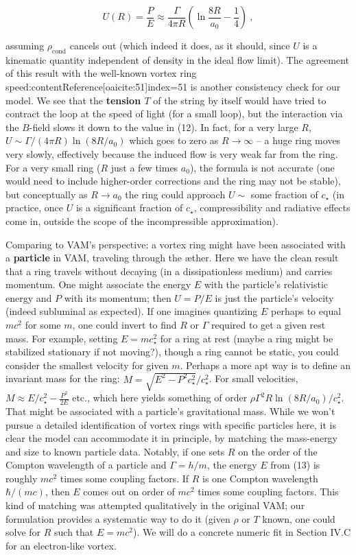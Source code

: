 \documentclass[12pt]{article}
\begin{document}
\[ U(R) = \frac{P}{E} \approx \frac{\Gamma}{4\pi R} \left(\ln\frac{8R}{a_0} - \frac{1}{4}\right)~, \] 

assuming $\rho_{\text{cond}}$ cancels out (which indeed it does, as it should, since $U$ is a kinematic quantity independent of density in the ideal flow limit). The agreement of this result with the well-known vortex ring speed:contentReference[oaicite:51]{index=51} is another consistency check for our model. We see that the \textbf{tension $T$} of the string by itself would have tried to contract the loop at the speed of light (for a small loop), but the interaction via the $B$-field slows it down to the value in (12). In fact, for a very large $R$, $U \sim \Gamma/(4\pi R)\ln(8R/a_0)$ which goes to zero as $R\to \infty$ – a huge ring moves very slowly, effectively because the induced flow is very weak far from the ring. For a very small ring ($R$ just a few times $a_0$), the formula is not accurate (one would need to include higher-order corrections and the ring may not be stable), but conceptually as $R \to a_0$ the ring could approach $U \sim$ some fraction of $c_\star$ (in practice, once $U$ is a significant fraction of $c_\star$, compressibility and radiative effects come in, outside the scope of the incompressible approximation).

Comparing to VAM’s perspective: a vortex ring might have been associated with a \textbf{particle} in VAM, traveling through the æther. Here we have the clean result that a ring travels without decaying (in a dissipationless medium) and carries momentum. One might associate the energy $E$ with the particle’s relativistic energy and $P$ with its momentum; then $U = P/E$ is just the particle’s velocity (indeed subluminal as expected). If one imagines quantizing $E$ perhaps to equal $mc^2$ for some $m$, one could invert to find $R$ or $\Gamma$ required to get a given rest mass. For example, setting $E = m c_\star^2$ for a ring at rest (maybe a ring might be stabilized stationary if not moving?), though a ring cannot be static, you could consider the smallest velocity for given $m$. Perhaps a more apt way is to define an invariant mass for the ring: $M = \sqrt{E^2 - P^2 c_\star^2}/c_\star^2$. For small velocities, $M \approx E/c_\star^2 - \frac{P^2}{2E}$ etc., which here yields something of order $\rho \Gamma^2 R \ln(8R/a_0)/c_\star^2$. That might be associated with a particle’s gravitational mass. While we won’t pursue a detailed identification of vortex rings with specific particles here, it is clear the model can accommodate it in principle, by matching the mass-energy and size to known particle data. Notably, if one sets $R$ on the order of the Compton wavelength of a particle and $\Gamma = h/m$, the energy $E$ from (13) is roughly $mc^2$ times some coupling factors. If $R$ is one Compton wavelength $\hbar/(mc)$, then $E$ comes out on order of $mc^2$ times some coupling factors. This kind of matching was attempted qualitatively in the original VAM; our formulation provides a systematic way to do it (given $\rho$ or $T$ known, one could solve for $R$ such that $E = m c^2$). We will do a concrete numeric fit in Section IV.C for an electron-like vortex.
\end{document}
